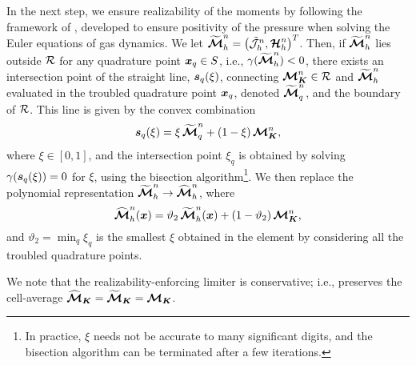 In the next step, we ensure realizability of the moments by following the framework of \cite{zhangShu_2010b}, developed to ensure positivity of the pressure when solving the Euler equations of gas dynamics.  
We let $\widetilde{\boldsymbol{\mathcal{M}}}_{h}^{n}=\big(\tilde{\mathcal{J}}_{h}^{n},\boldsymbol{\mathcal{H}}_{h}^{n}\big)^{T}$.  
Then, if $\widetilde{\boldsymbol{\mathcal{M}}}_{h}^{n}$ lies outside $\mathcal{R}$ for any quadrature point $\boldsymbol{x}_{q}\in S$, i.e., $\gamma(\widetilde{\boldsymbol{\mathcal{M}}}_{h}^{n})<0$, there exists an intersection point of the straight line, $\boldsymbol{s}_{q}(\xi)$, connecting $\boldsymbol{\mathcal{M}}_{\boldsymbol{K}}^{n}\in\mathcal{R}$ and $\widetilde{\boldsymbol{\mathcal{M}}}_{h}^{n}$ evaluated in the troubled quadrature point $\boldsymbol{x}_{q}$, denoted $\widetilde{\boldsymbol{\mathcal{M}}}_{q}^{n}$, and the boundary of $\mathcal{R}$.  
This line is given by the convex combination 
\begin{equation}
  \boldsymbol{s}_{q}(\xi)=\xi\,\widetilde{\boldsymbol{\mathcal{M}}}_{q}^{n}+(1-\xi)\,\boldsymbol{\mathcal{M}}_{\boldsymbol{K}}^{n},
\end{equation}
where $\xi\in[0,1]$, and the intersection point $\xi_{q}$ is obtained by solving $\gamma(\boldsymbol{s}_{q}(\xi))=0$ for $\xi$, using the bisection algorithm\footnote{In practice, $\xi$ needs not be accurate to many significant digits, and the bisection algorithm can be terminated after a few iterations.}.  
We then replace the polynomial representation $\widetilde{\boldsymbol{\mathcal{M}}}_{h}^{n}\to\widehat{\boldsymbol{\mathcal{M}}}_{h}^{n}$, where
\begin{equation}
  \widehat{\boldsymbol{\mathcal{M}}}_{h}^{n}(\boldsymbol{x})=\vartheta_{2}\,\widetilde{\boldsymbol{\mathcal{M}}}_{h}^{n}(\boldsymbol{x})+(1-\vartheta_{2})\,\boldsymbol{\mathcal{M}}_{\boldsymbol{K}}^{n},
  \label{eq:limitMoments}
\end{equation}
and $\vartheta_{2}=\min_{q}\xi_{q}$ is the smallest $\xi$ obtained in the element by considering all the troubled quadrature points.  

We note that the realizability-enforcing limiter is conservative; i.e., preserves the cell-average $\widehat{\boldsymbol{\mathcal{M}}}_{\boldsymbol{K}}=\widetilde{\boldsymbol{\mathcal{M}}}_{\boldsymbol{K}}=\boldsymbol{\mathcal{M}}_{\boldsymbol{K}}$.  